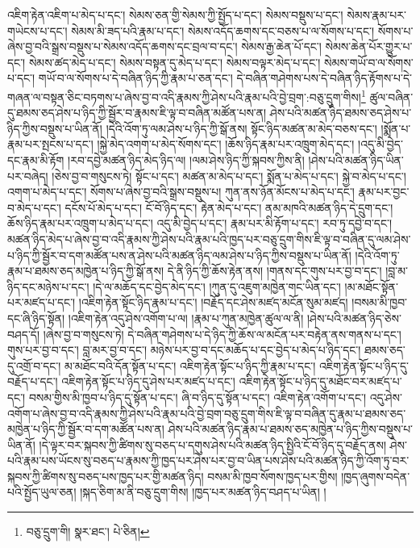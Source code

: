 འཇིག་རྟེན་འཇིག་པ་མེད་པ་དང་། སེམས་ཅན་གྱི་སེམས་ཀྱི་སྤྱོད་པ་དང་། སེམས་བསྡུས་པ་དང་། སེམས་རྣམ་པར་གཡེངས་པ་དང་། སེམས་མི་ཟད་པའི་རྣམ་པ་དང་། སེམས་འདོད་ཆགས་དང་བཅས་པ་ལ་སོགས་པ་དང་། སོགས་པ་ཞེས་བྱ་བའི་སྒྲས་བསྡུས་པ་སེམས་འདོད་ཆགས་དང་བྲལ་བ་དང་། སེམས་རྒྱ་ཆེན་པོ་དང་། སེམས་ཆེན་པོར་གྱུར་པ་དང་། སེམས་ཚད་མེད་པ་དང་། སེམས་བསྟན་དུ་མེད་པ་དང་། སེམས་བལྟར་མེད་པ་དང་། སེམས་གཡོ་བ་ལ་སོགས་པ་དང་། གཡོ་བ་ལ་སོགས་པ་དེ་བཞིན་ཉིད་ཀྱི་རྣམ་པ་ཅན་དང་། དེ་བཞིན་གཤེགས་པས་དེ་བཞིན་ཉིད་རྟོགས་པ་དེ་གཞན་ལ་བསྟན་ཅིང་བཏགས་པ་ཞེས་བྱ་བ་འདི་རྣམས་ཀྱི་ཤེས་པའི་རྣམ་པའི་བྱེ་བྲག་:བཅུ་དྲུག་གིས།\footnote{བཅུ་དྲུག་གི།  སྣར་ཐང་།  པེ་ཅིན། } ཚུལ་བཞིན་དུ་ཐམས་ཅད་ཤེས་པ་ཉིད་ཀྱི་སྦྱོར་བ་རྣམས་ཇི་ལྟ་བ་བཞིན་མཚོན་པས་ན། ཤེས་པའི་མཚན་ཉིད་ཐམས་ཅད་ཤེས་པ་ཉིད་ཀྱིས་བསྡུས་པ་ཡིན་ནོ། །དེའི་འོག་ཏུ་ལམ་ཤེས་པ་ཉིད་ཀྱི་སྒོ་ནས། སྟོང་ཉིད་མཚན་མ་མེད་བཅས་དང་། །སྨོན་པ་རྣམ་པར་སྤངས་པ་དང་། །སྐྱེ་མེད་འགག་པ་མེད་སོགས་དང་། །ཆོས་ཉིད་རྣམ་པར་འཁྲུག་མེད་དང་། །འདུ་མི་བྱེད་དང་རྣམ་མི་རྟོག །རབ་དབྱེ་མཚན་ཉིད་མེད་ཉིད་ལ། །ལམ་ཤེས་ཉིད་ཀྱི་སྐབས་ཀྱིས་ནི། །ཤེས་པའི་མཚན་ཉིད་ཡིན་པར་བཞེད། །ཅེས་བྱ་བ་གསུངས་ཏེ། སྟོང་པ་དང་། མཚན་མ་མེད་པ་དང་། སྨོན་པ་མེད་པ་དང་། སྐྱེ་བ་མེད་པ་དང་། འགག་པ་མེད་པ་དང་། སོགས་པ་ཞེས་བྱ་བའི་སྒྲས་བསྡུས་པ། ཀུན་ནས་ཉོན་མོངས་པ་མེད་པ་དང་། རྣམ་པར་བྱང་བ་མེད་པ་དང་། དངོས་པོ་མེད་པ་དང་། ངོ་བོ་ཉིད་དང་། རྟེན་མེད་པ་དང་། ནམ་མཁའི་མཚན་ཉིད་དེ་དྲུག་དང་། ཆོས་ཉིད་རྣམ་པར་འཁྲུག་པ་མེད་པ་དང་། འདུ་མི་བྱེད་པ་དང་། རྣམ་པར་མི་རྟོག་པ་དང་། རབ་ཏུ་དབྱེ་བ་དང་། མཚན་ཉིད་མེད་པ་ཞེས་བྱ་བ་འདི་རྣམས་ཀྱི་ཤེས་པའི་རྣམ་པའི་ཁྱད་པར་བཅུ་དྲུག་གིས་ཇི་ལྟ་བ་བཞིན་དུ་ལམ་ཤེས་པ་ཉིད་ཀྱི་སྦྱོར་བ་དག་མཚོན་པས་ན་ཤེས་པའི་མཚན་ཉིད་ལམ་ཤེས་པ་ཉིད་ཀྱིས་བསྡུས་པ་ཡིན་ནོ། །དེའི་འོག་ཏུ་རྣམ་པ་ཐམས་ཅད་མཁྱེན་པ་ཉིད་ཀྱི་སྒོ་ནས། དེ་ནི་ཉིད་ཀྱི་ཆོས་རྟེན་ནས། །གནས་དང་གུས་པར་བྱ་བ་དང་། །བླ་མ་ཉིད་དང་མཉེས་པ་དང་། །དེ་ལ་མཆོད་དང་བྱེད་མེད་དང་། །ཀུན་དུ་འཇུག་མཁྱེན་གང་ཡིན་དང་། །མ་མཐོང་སྟོན་པར་མཛད་པ་དང་། །འཇིག་རྟེན་སྟོང་ཉིད་རྣམ་པ་དང་། །བརྗོད་དང་ཤེས་མཛད་མངོན་སུམ་མཛད། །བསམ་མི་ཁྱབ་དང་ཞི་ཉིད་སྟོན། །འཇིག་རྟེན་འདུ་ཤེས་འགོག་པ་ལ། །རྣམ་པ་ཀུན་མཁྱེན་ཚུལ་ལ་ནི། །ཤེས་པའི་མཚན་ཉིད་ཅེས་བཤད་དོ། །ཞེས་བྱ་བ་གསུངས་ཏེ། དེ་བཞིན་གཤེགས་པ་དེ་ཉིད་ཀྱི་ཆོས་ལ་མངོན་པར་བརྟེན་ནས་གནས་པ་དང་། གུས་པར་བྱ་བ་དང་། བླ་མར་བྱ་བ་དང་། མཉེས་པར་བྱ་བ་དང་མཆོད་པ་དང་བྱེད་པ་མེད་པ་ཉིད་དང་། ཐམས་ཅད་དུ་འགྲོ་བ་དང་། མ་མཐོང་བའི་དོན་སྟོན་པ་དང་། འཇིག་རྟེན་སྟོང་པ་ཉིད་ཀྱི་རྣམ་པ་དང་། འཇིག་རྟེན་སྟོང་པ་ཉིད་དུ་བརྗོད་པ་དང་། འཇིག་རྟེན་སྟོང་པ་ཉིད་དུ་ཤེས་པར་མཛད་པ་དང་། འཇིག་རྟེན་སྟོང་པ་ཉིད་དུ་མཐོང་བར་མཛད་པ་དང་། བསམ་གྱིས་མི་ཁྱབ་པ་ཉིད་དུ་སྟོན་པ་དང་། ཞི་བ་ཉིད་དུ་སྟོན་པ་དང་། འཇིག་རྟེན་འགོག་པ་དང་། འདུ་ཤེས་འགོག་པ་ཞེས་བྱ་བ་འདི་རྣམས་ཀྱི་ཤེས་པའི་རྣམ་པའི་བྱེ་བྲག་བཅུ་དྲུག་གིས་ཇི་ལྟ་བ་བཞིན་དུ་རྣམ་པ་ཐམས་ཅད་མཁྱེན་པ་ཉིད་ཀྱི་སྦྱོར་བ་དག་མཚོན་པས་ན། ཤེས་པའི་མཚན་ཉིད་རྣམ་པ་ཐམས་ཅད་མཁྱེན་པ་ཉིད་ཀྱིས་བསྡུས་པ་ཡིན་ནོ། །དེ་ལྟར་བར་སྐབས་ཀྱི་ཚིགས་སུ་བཅད་པ་དགུས་ཤེས་པའི་མཚན་ཉིད་སྤྱིའི་ངོ་བོ་ཉིད་དུ་བརྗོད་ནས། ཤེས་པའི་རྣམ་པས་ཡོངས་སུ་བཅད་པ་རྣམས་ཀྱི་ཁྱད་པར་ཤེས་པར་བྱ་བ་ཡིན་པས་ཤེས་པའི་མཚན་ཉིད་ཀྱི་འོག་ཏུ་བར་སྐབས་ཀྱི་ཚིགས་སུ་བཅད་པས་ཁྱད་པར་གྱི་མཚན་ཉིད། བསམ་མི་ཁྱབ་སོགས་ཁྱད་པར་གྱིས། །ཁྱད་ཞུགས་བདེན་པའི་སྤྱོད་ཡུལ་ཅན། །སྐད་ཅིག་མ་ནི་བཅུ་དྲུག་གིས། །ཁྱད་པར་མཚན་ཉིད་བཤད་པ་ཡིན། །
